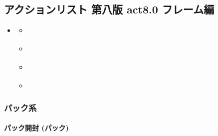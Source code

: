 \documentclass[letterpaper,10pt,dvipdfmx]{sphinxmanual}
\begin{document}
\subsection{アクションリスト 第八版 act8.0 フレーム編}
\label{\detokenize{auto/frameActionlist:act8-0}}\label{\detokenize{auto/frameActionlist:act-act-frame}}\label{\detokenize{auto/frameActionlist::doc}}
\begin{sphinxShadowBox}
\begin{itemize}
\item {} 
\sphinxAtStartPar
{}\label{\detokenize{auto/frameActionlist:id7}}{\hyperref[\detokenize{auto/frameActionlist:id2}]{}}
\begin{itemize}
\item {} 
\sphinxAtStartPar
{}\label{\detokenize{auto/frameActionlist:id8}}{\hyperref[\detokenize{auto/frameActionlist:act-packopen}]{}}

\item {} 
\sphinxAtStartPar
{}\label{\detokenize{auto/frameActionlist:id9}}{\hyperref[\detokenize{auto/frameActionlist:act-raredraw}]{}}

\item {} 
\sphinxAtStartPar
{}\label{\detokenize{auto/frameActionlist:id10}}{\hyperref[\detokenize{auto/frameActionlist:act-summonsrare}]{}}

\item {} 
\sphinxAtStartPar
{}\label{\detokenize{auto/frameActionlist:id11}}{\hyperref[\detokenize{auto/frameActionlist:act-trapcounter}]{}}

\end{itemize}

\end{itemize}
\end{sphinxShadowBox}


\subsubsection{パック系}
\label{\detokenize{auto/frameActionlist:id2}}

\paragraph{パック開封 (パック)}
\label{\detokenize{auto/frameActionlist:act-packopen}}\label{\detokenize{auto/frameActionlist:id3}}
\sphinxAtStartPar
{}
\end{document}

